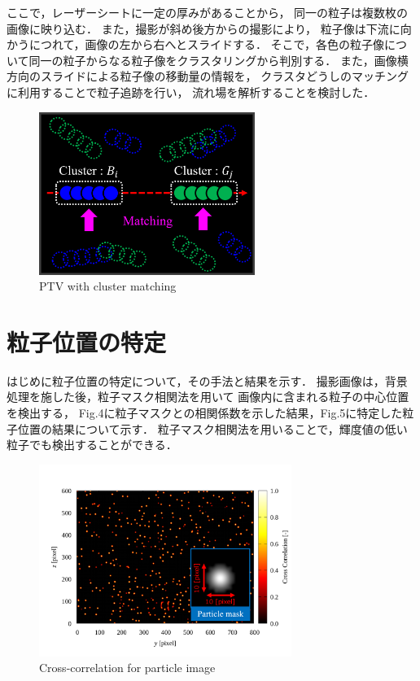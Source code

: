 \documentclass[twocolumn,a4j]{jsarticle}
\begin{document}
\newpage
ここで，レーザーシートに一定の厚みがあることから，
同一の粒子は複数枚の画像に映り込む．
また，撮影が斜め後方からの撮影により，
粒子像は下流に向かうにつれて，画像の左から右へとスライドする．
そこで，各色の粒子像について同一の粒子からなる粒子像をクラスタリングから判別する．
また，画像横方向のスライドによる粒子像の移動量の情報を，
クラスタどうしのマッチングに利用することで粒子追跡を行い，
流れ場を解析することを検討した．

\begin{figure}[htbp]
	\centering
	\includegraphics[keepaspectratio, width=70mm]{../images/PTV_mthod_with_cluster_matching.png}
	\caption{PTV with cluster matching}
\end{figure}

\section{粒子位置の特定}
はじめに粒子位置の特定について，その手法と結果を示す．
撮影画像は，背景処理を施した後，粒子マスク相関法を用いて
画像内に含まれる粒子の中心位置を検出する，
Fig.4に粒子マスクとの相関係数を示した結果，Fig.5に特定した粒子位置の結果について示す．
粒子マスク相関法を用いることで，輝度値の低い粒子でも検出することができる．

\begin{figure}[htbp]
	\centering
	\includegraphics[keepaspectratio, width=82mm]{../images/closs-correlation_for_particle.png}
	\caption{Cross-correlation for particle image}
\end{figure}
\end{document}
